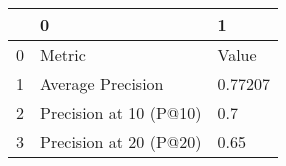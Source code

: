 \begin{tabular}{lll}
\toprule
{} &                       0 &        1 \\
\midrule
0 &                  Metric &    Value \\
1 &       Average Precision &  0.77207 \\
2 &  Precision at 10 (P@10) &      0.7 \\
3 &  Precision at 20 (P@20) &     0.65 \\
\bottomrule
\end{tabular}
